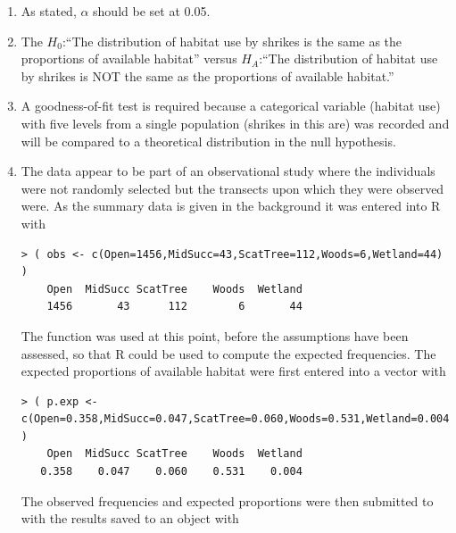 \documentclass[10pt,openany]{book}\usepackage[]{graphicx}\usepackage[]{color}
\makeatletter
\newenvironment{kframe}{%
 \def\at@end@of@kframe{}%
 \ifinner\ifhmode%
  \def\at@end@of@kframe{\end{minipage}}%
  \begin{minipage}{\columnwidth}%
 \fi\fi%
 \def\FrameCommand##1{\hskip\@totalleftmargin \hskip-\fboxsep
 \colorbox{shadecolor}{##1}\hskip-\fboxsep
     \hskip-\linewidth \hskip-\@totalleftmargin \hskip\columnwidth}%
 \MakeFramed {\advance\hsize-\width
   \@totalleftmargin\z@ \linewidth\hsize
   \@setminipage}}%
 {\par\unskip\endMakeFramed%
 \at@end@of@kframe}
\newenvironment{knitrout}{}{} %
\makeatother
\begin{document}
\begin{enumerate}
  \item As stated, $\alpha$ should be set at 0.05.
  \item The  $H_{0}$:``The distribution of habitat use by shrikes is the same as the proportions of available habitat'' versus $H_{A}$:``The distribution of habitat use by shrikes is NOT the same as the proportions of available habitat.''
  \item A goodness-of-fit test is required because a categorical variable (habitat use) with five levels from a single population (shrikes in this are) was recorded and will be compared to a theoretical distribution in the null hypothesis.
  \item The data appear to be part of an observational study where the individuals were not randomly selected but the transects upon which they were observed were.  As the summary data is given in the background it was entered into R with
\begin{knitrout}
\color{fgcolor}\begin{kframe}
\begin{verbatim}
> ( obs <- c(Open=1456,MidSucc=43,ScatTree=112,Woods=6,Wetland=44) )
    Open  MidSucc ScatTree    Woods  Wetland 
    1456       43      112        6       44 
\end{verbatim}
\end{kframe}
\end{knitrout}
The  function was used at this point, before the assumptions have been assessed, so that R could be used to compute the expected frequencies.  The expected proportions of available habitat were first entered into a vector with
\begin{knitrout}
\color{fgcolor}\begin{kframe}
\begin{verbatim}
> ( p.exp <- c(Open=0.358,MidSucc=0.047,ScatTree=0.060,Woods=0.531,Wetland=0.004) )
    Open  MidSucc ScatTree    Woods  Wetland 
   0.358    0.047    0.060    0.531    0.004 
\end{verbatim}
\end{kframe}
\end{knitrout}
The observed frequencies and expected proportions were then submitted to  with the results saved to an object with
\begin{knitrout}
\color{fgcolor}\begin{kframe}

\end{kframe}
\end{knitrout}
\end{enumerate}
\end{document}
